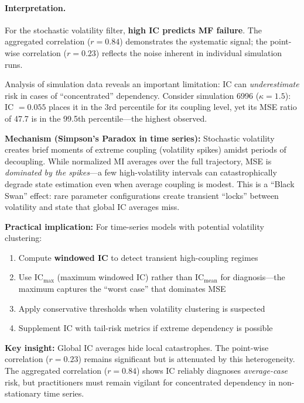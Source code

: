 \documentclass[10pt]{article} %
\theoremstyle{plain}
\theoremstyle{definition}
\newcommand{\IC}{\mathrm{IC}}  %
\begin{document}
\paragraph{Interpretation.} For the stochastic volatility filter, \textbf{high IC predicts MF failure}. The aggregated correlation ($r = 0.84$) demonstrates the systematic signal; the point-wise correlation ($r = 0.23$) reflects the noise inherent in individual simulation runs.

\begin{tcolorbox}[breakable, colback=gray!10, colframe=black, title=\textbf{The Volatility Trap: A Second-Order Insight}, fonttitle=\bfseries]
Analysis of simulation data reveals an important limitation: IC can \emph{underestimate} risk in cases of ``concentrated'' dependency. Consider simulation 6996 ($\kappa = 1.5$): IC $= 0.055$ places it in the 3rd percentile for its coupling level, yet its MSE ratio of 47.7 is in the 99.5th percentile---the highest observed.

\textbf{Mechanism (Simpson's Paradox in time series):} Stochastic volatility creates brief moments of extreme coupling (volatility spikes) amidst periods of decoupling. While normalized MI averages over the full trajectory, MSE is \emph{dominated by the spikes}---a few high-volatility intervals can catastrophically degrade state estimation even when average coupling is modest. This is a ``Black Swan'' effect: rare parameter configurations create transient ``locks'' between volatility and state that global IC averages miss.

\textbf{Practical implication:} For time-series models with potential volatility clustering:
\begin{enumerate}
    \item Compute \textbf{windowed IC} to detect transient high-coupling regimes
    \item Use $\IC_{\max}$ (maximum windowed IC) rather than $\IC_{\text{mean}}$ for diagnosis---the maximum captures the ``worst case'' that dominates MSE
    \item Apply conservative thresholds when volatility clustering is suspected
    \item Supplement IC with tail-risk metrics if extreme dependency is possible
\end{enumerate}

\textbf{Key insight:} Global IC averages hide local catastrophes. The point-wise correlation ($r = 0.23$) remains significant but is attenuated by this heterogeneity. The aggregated correlation ($r = 0.84$) shows IC reliably diagnoses \emph{average-case} risk, but practitioners must remain vigilant for concentrated dependency in non-stationary time series.
\end{tcolorbox}
\end{document}
